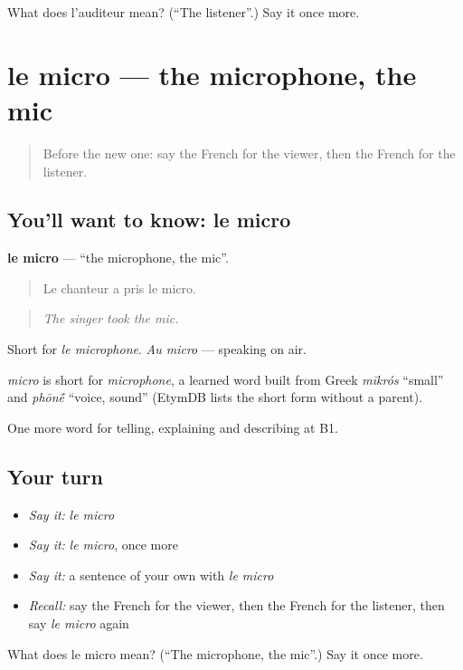 \begin{tcolorbox}[breakable,colback=teal!4,colframe=teal!35!black,title={Before you move on}]
What does l'auditeur mean? (\textquotedblleft{}The listener\textquotedblright{}.) Say it once more.
\end{tcolorbox}
\section[le micro]{le micro — the microphone, the mic}

\label{lesson:FR-C280-micro}



\begin{quote}
Before the new one: say the French for the viewer, then the French for the listener.
\end{quote}

\subsection*{You'll want to know: le micro}
\textbf{le micro} — \textquotedblleft{}the microphone, the mic\textquotedblright{}.

\begin{quote}
Le chanteur a pris le micro.
\end{quote}

\begin{quote}
\emph{The singer took the mic.}
\end{quote}

Short for \emph{le microphone}. \emph{Au micro} — speaking on air.

\begin{cousinweb}
\emph{micro} is short for \emph{microphone}, a learned word built from Greek \emph{mīkrós} \textquotedblleft{}small\textquotedblright{} and \emph{phōn\'{\={e}}} \textquotedblleft{}voice, sound\textquotedblright{} (EtymDB lists the short form without a parent).
\end{cousinweb}

\begin{grammarlens}[title={What you've built}]
One more word for telling, explaining and describing at B1.
\end{grammarlens}

\subsection*{Your turn}
\begin{itemize}
\raggedright
  \item \emph{Say it:} \emph{le micro}
  \item \emph{Say it:} \emph{le micro}, once more
  \item \emph{Say it:} a sentence of your own with \emph{le micro}
  \item \emph{Recall:} say the French for the viewer, then the French for the listener, then say \emph{le micro} again
\end{itemize}

\begin{tcolorbox}[breakable,colback=teal!4,colframe=teal!35!black,title={Before you move on}]
What does le micro mean? (\textquotedblleft{}The microphone, the mic\textquotedblright{}.) Say it once more.
\end{tcolorbox}
